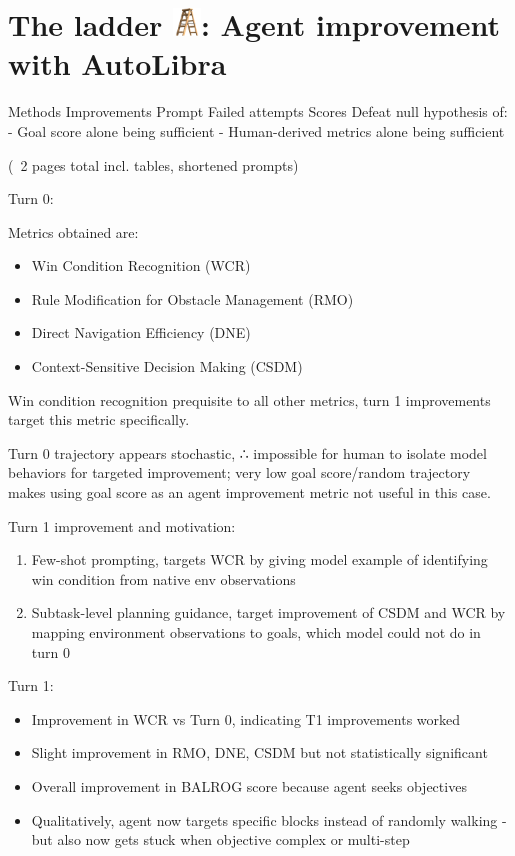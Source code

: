 \usepackage{fontspec}
\usepackage{emoji}
\usepackage[table,xcdraw]{xcolor}
\section{The ladder \protect\includegraphics[height=1em]{figs/ladder.png}: Agent improvement with AutoLibra}


Methods
Improvements
Prompt
Failed attempts
Scores
Defeat null hypothesis of:
- Goal score alone being sufficient
- Human-derived metrics alone being sufficient

(~2 pages total incl. tables, shortened prompts)

Turn 0:

Metrics obtained are:
\begin{itemize}
    \item Win Condition Recognition (WCR)
    \item Rule Modification for Obstacle Management (RMO)
    \item Direct Navigation Efficiency (DNE)
    \item Context-Sensitive Decision Making (CSDM)
\end{itemize}
Win condition recognition prequisite to all other metrics, turn 1 improvements target this metric specifically.

Turn 0 trajectory appears stochastic, ∴ impossible for human to isolate model behaviors for targeted improvement; very low goal score/random trajectory makes using goal score as an agent improvement metric not useful in this case.

Turn 1 improvement and motivation:
\begin{enumerate}
    \item Few-shot prompting, targets WCR by giving model example of identifying win condition from native env observations
    \item Subtask-level planning guidance, target improvement of CSDM and WCR by mapping environment observations to goals, which model could not do in turn 0
\end{enumerate}

Turn 1:

\begin{itemize}
    \item Improvement in WCR vs Turn 0, indicating T1 improvements worked
    \item Slight improvement in RMO, DNE, CSDM but not statistically significant
    \item Overall improvement in BALROG score because agent seeks objectives
    \item Qualitatively, agent now targets specific blocks instead of randomly walking - but also now gets stuck when objective complex or multi-step
\end{itemize}

